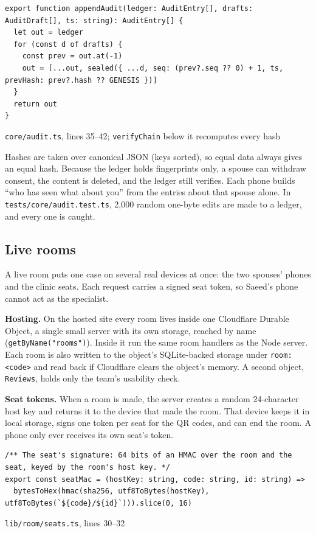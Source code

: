 \documentclass[10.5pt,a4paper]{article}
\newcommand{\code}[1]{\texttt{\small #1}}
\newcommand{\file}[1]{\leavevmode\textcolor{muted}{\texttt{\small #1}}}
\begin{document}
\begin{Verbatim}
export function appendAudit(ledger: AuditEntry[], drafts: AuditDraft[], ts: string): AuditEntry[] {
  let out = ledger
  for (const d of drafts) {
    const prev = out.at(-1)
    out = [...out, sealed({ ...d, seq: (prev?.seq ?? 0) + 1, ts, prevHash: prev?.hash ?? GENESIS })]
  }
  return out
}
\end{Verbatim}
{\footnotesize\color{muted}\code{core/audit.ts}, lines 35–42; \code{verifyChain} below it recomputes every hash}

Hashes are taken over canonical JSON (keys sorted), so equal data always gives an equal hash. Because the ledger holds
fingerprints only, a spouse can withdraw consent, the content is deleted, and the ledger still verifies. Each phone
builds ``who has seen what about you'' from the entries about that spouse alone. In
\file{tests/core/audit.test.ts}, 2,000 random one-byte edits are made to a ledger, and every one is caught.

\subsection{Live rooms}

A live room puts one case on several real devices at once: the two spouses' phones and the clinic seats. Each request
carries a signed seat token, so Saeed's phone cannot act as the specialist.

\textbf{Hosting.} On the hosted site every room lives inside one Cloudflare Durable Object, a single small server with
its own storage, reached by name (\code{getByName("rooms")}). Inside it run the same room handlers as the Node server.
Each room is also written to the object's SQLite-backed storage under \code{room:<code>} and read back if Cloudflare
clears the object's memory. A second object, \code{Reviews}, holds only the team's usability check.

\textbf{Seat tokens.} When a room is made, the server creates a random 24-character host key and returns it to the
device that made the room. That device keeps it in local storage, signs one token per seat for the QR codes, and can
end the room. A phone only ever receives its own seat's token.

\begin{Verbatim}
/** The seat's signature: 64 bits of an HMAC over the room and the seat, keyed by the room's host key. */
export const seatMac = (hostKey: string, code: string, id: string) =>
  bytesToHex(hmac(sha256, utf8ToBytes(hostKey), utf8ToBytes(`${code}/${id}`))).slice(0, 16)
\end{Verbatim}
{\footnotesize\color{muted}\code{lib/room/seats.ts}, lines 30–32}
\end{document}

